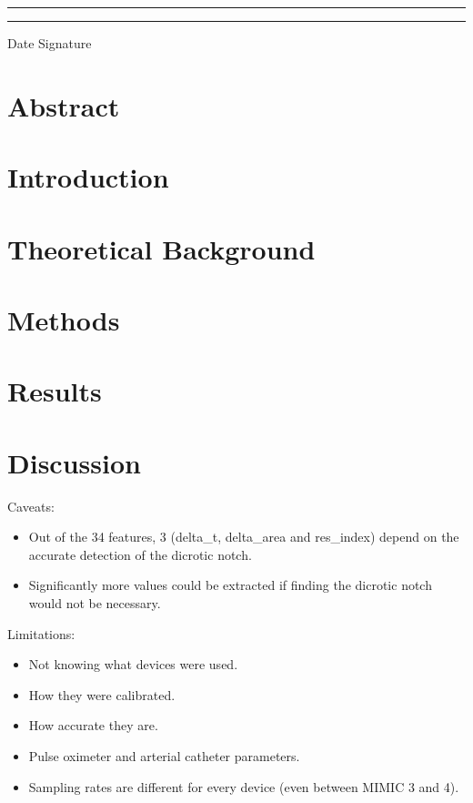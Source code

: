 \documentclass[12pt, bibliography=totoc]{scrartcl}
\begin{document}
    \rule{4cm}{0.5mm} \tab \qquad \qquad \rule{4cm}{0.5mm}

    Date \tab \qquad \qquad Signature

    \newpage
    \doublespacing
    \tableofcontents

    \newpage
    \onehalfspacing


    \section{Abstract}\label{sec:abstract}


    \section{Introduction}
    \label{sec:introduction}
    


    \section{Theoretical Background}
    \label{sec:background}
    


    \section{Methods}
    \label{sec:methods}
    


    \section{Results}
    \label{sec:results}
    
    \section{Discussion}
    \label{sec:discussion}

    Caveats:
    \begin{itemize}
        \item Out of the 34 features, 3 (delta\_t, delta\_area and res\_index) depend on the accurate detection of the dicrotic notch.
        \item Significantly more values could be extracted if finding the dicrotic notch would not be necessary.
    \end{itemize}

    Limitations:
    \begin{itemize}
        \item Not knowing what devices were used.
        \item How they were calibrated.
        \item How accurate they are.
        \item Pulse oximeter and arterial catheter parameters.
        \item Sampling rates are different for every device (even between MIMIC 3 and 4).
    \end{itemize}
\end{document}
